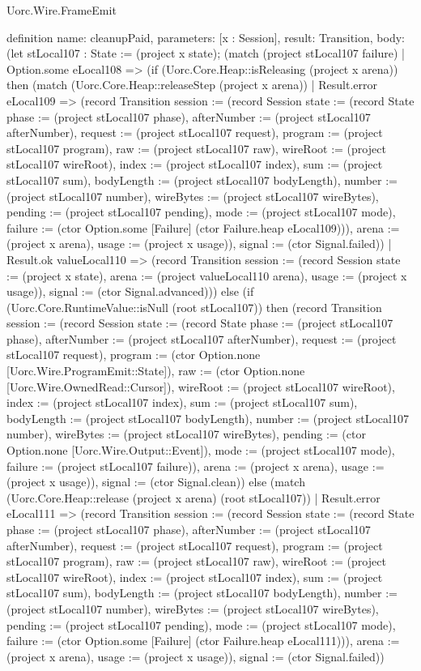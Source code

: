 \begin{lexlean}{Uorc.Wire.FrameEmit}
\begin{semanticmodule}
definition{
  name: cleanupPaid,
  parameters: [x : Session],
  result: Transition,
  body: (let stLocal107 : State := (project x state); (match (project stLocal107 failure)
    | Option.some eLocal108 => (if (Uorc.Core.Heap::isReleasing (project x arena)) then (match (Uorc.Core.Heap::releaseStep (project x arena))
      | Result.error eLocal109 => (record Transition {session := (record Session {state := (record State {phase := (project stLocal107 phase), afterNumber := (project stLocal107 afterNumber), request := (project stLocal107 request), program := (project stLocal107 program), raw := (project stLocal107 raw), wireRoot := (project stLocal107 wireRoot), index := (project stLocal107 index), sum := (project stLocal107 sum), bodyLength := (project stLocal107 bodyLength), number := (project stLocal107 number), wireBytes := (project stLocal107 wireBytes), pending := (project stLocal107 pending), mode := (project stLocal107 mode), failure := (ctor Option.some [Failure] (ctor Failure.heap eLocal109))}), arena := (project x arena), usage := (project x usage)}), signal := (ctor Signal.failed)})
      | Result.ok valueLocal110 => (record Transition {session := (record Session {state := (project x state), arena := (project valueLocal110 arena), usage := (project x usage)}), signal := (ctor Signal.advanced)})) else (if (Uorc.Core.RuntimeValue::isNull (root stLocal107)) then (record Transition {session := (record Session {state := (record State {phase := (project stLocal107 phase), afterNumber := (project stLocal107 afterNumber), request := (project stLocal107 request), program := (ctor Option.none [Uorc.Wire.ProgramEmit::State]), raw := (ctor Option.none [Uorc.Wire.OwnedRead::Cursor]), wireRoot := (project stLocal107 wireRoot), index := (project stLocal107 index), sum := (project stLocal107 sum), bodyLength := (project stLocal107 bodyLength), number := (project stLocal107 number), wireBytes := (project stLocal107 wireBytes), pending := (ctor Option.none [Uorc.Wire.Output::Event]), mode := (project stLocal107 mode), failure := (project stLocal107 failure)}), arena := (project x arena), usage := (project x usage)}), signal := (ctor Signal.clean)}) else (match (Uorc.Core.Heap::release (project x arena) (root stLocal107))
      | Result.error eLocal111 => (record Transition {session := (record Session {state := (record State {phase := (project stLocal107 phase), afterNumber := (project stLocal107 afterNumber), request := (project stLocal107 request), program := (project stLocal107 program), raw := (project stLocal107 raw), wireRoot := (project stLocal107 wireRoot), index := (project stLocal107 index), sum := (project stLocal107 sum), bodyLength := (project stLocal107 bodyLength), number := (project stLocal107 number), wireBytes := (project stLocal107 wireBytes), pending := (project stLocal107 pending), mode := (project stLocal107 mode), failure := (ctor Option.some [Failure] (ctor Failure.heap eLocal111))}), arena := (project x arena), usage := (project x usage)}), signal := (ctor Signal.failed)})
}
\end{semanticmodule}
\end{lexlean}
